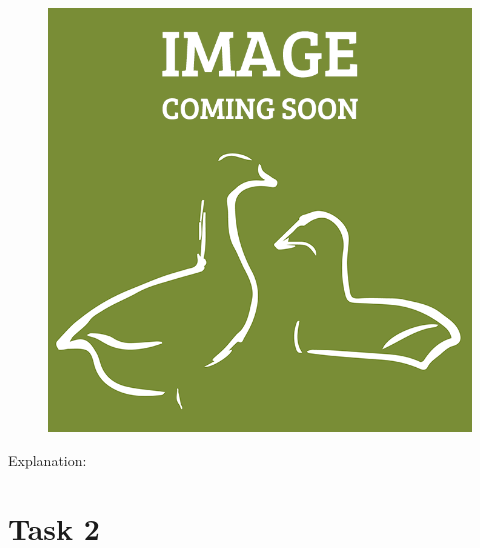 \documentclass[a4paper,11pt,oneside]{scrreprt}
\begin{document}
\begin{figure}[h]
	\centering
	\includegraphics[clip, trim=0cm 0cm 0cm 0cm, scale=0.25]{./images/redesign.png}
\end{figure}

	Explanation:\\
	

\bigskip


%


\clearpage

\section*{Task 2}
\end{document}
